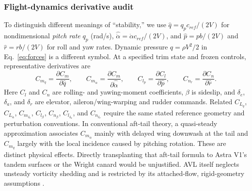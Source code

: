 \documentclass[10pt,letterpaper]{article}
\begin{document}
\subsubsection{Flight-dynamics derivative audit}
To distinguish different meanings of ``stability,'' we use $\hat q=q_pc_{ref}/(2V)$ for nondimensional \emph{pitch rate} $q_p$ (rad/s), $\widehat{\dot\alpha}=\dot\alpha c_{ref}/(2V)$, and $\hat p=pb/(2V)$ and $\hat r=rb/(2V)$ for roll and yaw rates. Dynamic pressure $q=\rho V^2/2$ in Eq.~\ref{eq:forces} is a different symbol. At a specified trim state and frozen controls, representative derivatives are
\begin{equation}
C_{m_q}=\frac{\partial C_m}{\partial\hat q},\qquad
C_{m_{\dot\alpha}}=\frac{\partial C_m}{\partial\widehat{\dot\alpha}},\qquad
C_{l_p}=\frac{\partial C_l}{\partial\hat p},\qquad
C_{n_r}=\frac{\partial C_n}{\partial\hat r}.
\label{eq:rate_derivatives}
\end{equation}
Here $C_l$ and $C_n$ are rolling- and yawing-moment coefficients, $\beta$ is sideslip, and $\delta_e$, $\delta_a$, and $\delta_r$ are elevator, aileron/wing-warping and rudder commands. Related $C_{L_q}$, $C_{L_{\dot\alpha}}$, $C_{m_{\delta_e}}$, $C_{l_\beta}$, $C_{n_\beta}$, $C_{l_{\delta_a}}$, and $C_{n_{\delta_r}}$ require the same stated reference geometry and perturbation conventions. In conventional aft-tail theory, a quasi-steady approximation associates $C_{m_{\dot\alpha}}$ mainly with delayed wing downwash at the tail and $C_{m_q}$ largely with the local incidence caused by pitching rotation. These are distinct physical effects. Directly transplanting that aft-tail formula to Astra V1's tandem surfaces or the Wright canard would be unjustified. AVL itself neglects unsteady vorticity shedding and is restricted by its attached-flow, rigid-geometry assumptions \cite{ref40}.
\end{document}

